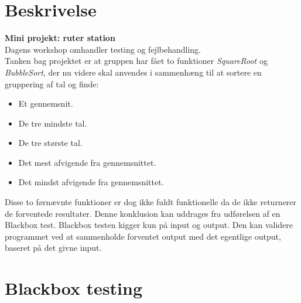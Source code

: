 \documentclass[11pt]{article}
\renewcommand{\baselinestretch}{1.20}
\begin{document}
    
    
    
    \renewcommand{\baselinestretch}{0.8}
    \tableofcontents
    \renewcommand{\baselinestretch}{1.20}
    \newpage
    
    \section{Beskrivelse}
    \textbf{Mini projekt: ruter station}\\
    \noindent
    Dagens workshop omhandler testing og fejlbehandling.\\
    Tanken bag projektet er at gruppen har fået to funktioner \textit{SquareRoot} og \textit{BubbleSort}, der nu videre skal anvendes i sammenhæng til at sortere en gruppering af tal og finde:
    \begin{itemize}
        \item Et gennemsnit.
        \item De tre mindste tal.
        \item De tre største tal.
        \item Det mest afvigende fra gennemsnittet.
        \item Det mindst afvigende fra gennemsnittet.
    \end{itemize}
    \noindent
    Disse to førnævnte funktioner er dog ikke fuldt funktionelle da de ikke returnerer de forventede resultater.
    Denne konklusion kan uddrages fra udførelsen af en Blackbox test. Blackbox testen kigger kun på input og output. Den kan validere programmet ved at sammenholde forventet output med det egentlige output, baseret på det givne input.
    \newpage
    \section{Blackbox testing}
\end{document}

